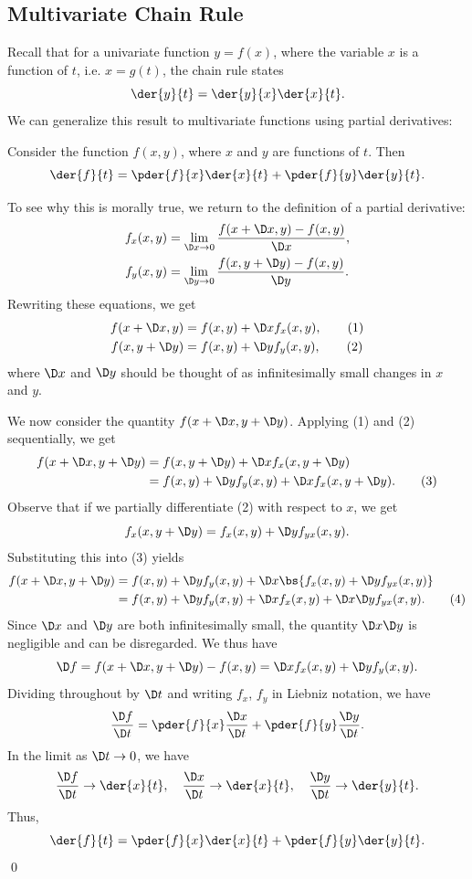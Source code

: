 \subsection{Multivariate Chain Rule}\label{subsec:Multivariate-Chain-Rule}

Recall that for a univariate function $y = f(x)$, where the variable $x$ is a function of $t$, i.e. $x = g(t)$, the chain rule states \[\der{y}{t} = \der{y}{x} \der{x}{t}.\] We can generalize this result to multivariate functions using partial derivatives:

\begin{proposition}
    Consider the function $f(x, y)$, where $x$ and $y$ are functions of $t$. Then \[\der{f}{t} = \pder{f}{x} \der{x}{t} + \pder{f}{y} \der{y}{t}.\]
\end{proposition}

To see why this is morally true, we return to the definition of a partial derivative:
\begin{align*}
    f_x(x, y) &= \lim_{\D x \to 0} \frac{f(x + \D x, y) - f(x, y)}{\D x},\\
    f_y(x, y) &= \lim_{\D y \to 0} \frac{f(x, y + \D y) - f(x, y)}{\D y}.
\end{align*}
Rewriting these equations, we get
\begin{align*}
    f(x + \D x, y) &= f(x, y) + \D x f_x(x, y), \tag{1}\\
    f(x, y + \D y) &= f(x, y) + \D y f_y(x, y), \tag{2}
\end{align*}
where $\D x$ and $\D y$ should be thought of as infinitesimally small changes in $x$ and $y$.

We now consider the quantity $f(x + \D x, y + \D y)$. Applying (1) and (2) sequentially, we get
\begin{align*}
    f(x + \D x, y + \D y) &= f(x, y + \D y) + \D x f_x(x, y + \D y)\\
    &= f(x, y) + \D y f_y(x,y) + \D x f_x(x, y + \D y). \tag{3}
\end{align*}
Observe that if we partially differentiate (2) with respect to $x$, we get \[f_x(x, y + \D y) = f_x(x, y) + \D y f_{yx}(x, y).\] Substituting this into (3) yields
\begin{align*}
    f(x + \D x, y + \D y) &= f(x, y) + \D y f_y(x,y) + \D x \bs{f_x(x, y) + \D y f_{yx}(x, y)}\\
    &= f(x, y) + \D y f_y(x,y) + \D x f_x(x, y) + \D x\D y f_{yx}(x, y). \tag{4}
\end{align*}
Since $\D x$ and $\D y$ are both infinitesimally small, the quantity $\D x \D y$ is negligible and can be disregarded. We thus have \[\D f = f(x + \D x, y + \D y) - f(x, y) = \D x f_x(x, y) + \D y f_y(x,y).\] Dividing throughout by $\D t$ and writing $f_x$, $f_y$ in Liebniz notation, we have \[\frac{\D f}{\D t} = \pder{f}{x} \frac{\D x}{\D t} + \pder{f}{y} \frac{\D y}{\D t}.\] In the limit as $\D t \to 0$, we have \[\frac{\D f}{\D t} \to \der{x}{t}, \quad \frac{\D x}{\D t} \to \der{x}{t}, \quad \frac{\D y}{\D t} \to \der{y}{t}.\] Thus, \[\der{f}{t} = \pder{f}{x} \der{x}{t} + \pder{f}{y} \der{y}{t}.\] \qed

